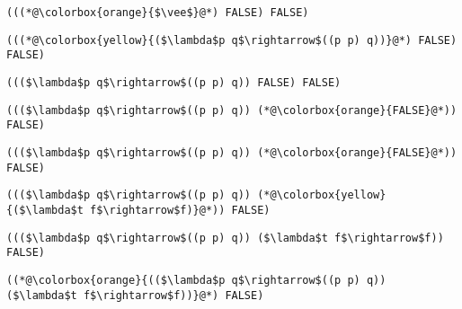 \documentclass{beamer}
\begin{document}
\begin{frame}[fragile]{\CurrentSection}
\lstset{basicstyle=\ttfamily\small}\lstset{numbers=none}\lstset{language=ML}\begin{lstlisting}
(((*@\colorbox{orange}{$\vee$}@*) FALSE) FALSE)
\end{lstlisting}
\pause\lstset{language=ML}\begin{lstlisting}
(((*@\colorbox{yellow}{($\lambda$p q$\rightarrow$((p p) q))}@*) FALSE) FALSE)
\end{lstlisting}

\end{frame}

\begin{frame}[fragile]{\CurrentSection}
\lstset{basicstyle=\ttfamily\small}\lstset{numbers=none}\lstset{language=ML}\begin{lstlisting}
((($\lambda$p q$\rightarrow$((p p) q)) FALSE) FALSE)
\end{lstlisting}
\pause\lstset{language=ML}\begin{lstlisting}
((($\lambda$p q$\rightarrow$((p p) q)) (*@\colorbox{orange}{FALSE}@*)) FALSE)
\end{lstlisting}

\end{frame}

\begin{frame}[fragile]{\CurrentSection}
\lstset{basicstyle=\ttfamily\small}\lstset{numbers=none}\lstset{language=ML}\begin{lstlisting}
((($\lambda$p q$\rightarrow$((p p) q)) (*@\colorbox{orange}{FALSE}@*)) FALSE)
\end{lstlisting}
\pause\lstset{language=ML}\begin{lstlisting}
((($\lambda$p q$\rightarrow$((p p) q)) (*@\colorbox{yellow}{($\lambda$t f$\rightarrow$f)}@*)) FALSE)
\end{lstlisting}

\end{frame}

\begin{frame}[fragile]{\CurrentSection}
\lstset{basicstyle=\ttfamily\small}\lstset{numbers=none}\lstset{language=ML}\begin{lstlisting}
((($\lambda$p q$\rightarrow$((p p) q)) ($\lambda$t f$\rightarrow$f)) FALSE)
\end{lstlisting}
\pause\lstset{language=ML}\begin{lstlisting}
((*@\colorbox{orange}{(($\lambda$p q$\rightarrow$((p p) q)) ($\lambda$t f$\rightarrow$f))}@*) FALSE)
\end{lstlisting}

\end{frame}
\end{document}
